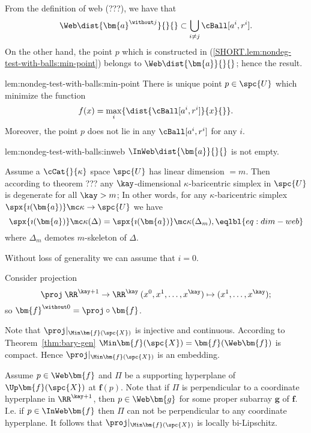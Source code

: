 From the definition of web (???), 
we have that 
$$\Web\dist{\bm{a}^{\without j}}{}{}\subset\bigcup_{i\not=j}\cBall[a^i,r^i].$$
On the other hand, the point $p$ which is constructed in (\ref{SHORT.lem:nondeg-test-with-balls:min-point}) belongs to $\Web\dist{\bm{a}}{}{}$;
hence the result.













\begin{subthm}{lem:nondeg-test-with-balls:min-point}
There is unique point $p\in \spc{U}$
which minimize the function 
$$f(x)=\max_i\{\dist{\cBall[a^i,r^i]}{x}{}\}.$$
Moreover, the point $p$ does not lie in any $\cBall[a^i,r^i]$ for any $i$.
\end{subthm}

\begin{subthm}{lem:nondeg-test-with-balls:inweb}
 $\InWeb\dist{\bm{a}}{}{}$ is not empty.
\end{subthm}













Assume a $\cCat{}{\kappa}$ space $\spc{U}$ 
has linear dimension $= m$.
Then according to theorem ??? 
any $\kay$-dimensional $\kappa$-baricentric simplex in $\spc{U}$ is degenerate for all $\kay>m$;
In other words,
for any $\kappa$-baricentric simplex $\spx{\imath(\bm{a})}\mc\kappa\to\spc{U}$
we have 
$$
\spx{\imath(\bm{a})}\mc\kappa(\Delta)=\spx{\imath(\bm{a})}\mc\kappa(\Delta_m),
\eqlbl{eq:dim-web}$$
where $\Delta_m$ demotes $m$-skeleton of $\Delta$. 

Without loss of generality we can assume that $i=0$.

Consider projection
$$\proj\:\RR^{\kay+1}\to\RR^\kay\:(x^0,x^1,\dots,x^\kay)\mapsto (x^1,\dots,x^\kay);$$
so $\bm{f}^{\without 0}=\proj\circ\bm{f}$.

Note that $\proj|_{\Min\bm{f}(\spc{X})}$ is injective and continuous.
According to Theorem~\ref{thm:bary-gen} $\Min\bm{f}(\spc{X})=\bm{f}(\Web\bm{f})$ is compact.
Hence $\proj|_{\Min\bm{f}(\spc{X})}$ is an embedding.

Assume $p\in \Web\bm{f}$ and 
$\Pi$ be a supporting hyperplane of $\Up\bm{f}(\spc{X})$ at $\bm{f}(p)$.
Note that if $\Pi$ is perpendicular to a coordinate hyperplane in $\RR^{\kay+1}$,
then $p\in \Web \bm{g}$ for some proper subarray $\bm{g}$ of $\bm{f}$.
I.e. if $p\in \InWeb\bm{f}$ then $\Pi$ can not be perpendicular to any coordinate hyperplane.
It follows that $\proj|_{\Min\bm{f}(\spc{X})}$ is locally bi-Lipschitz.

